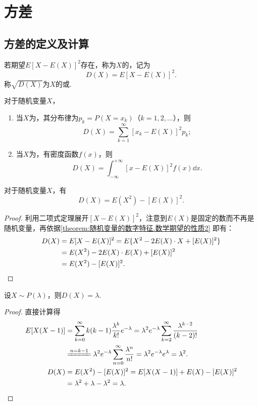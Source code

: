 \section{方差}
\subsection{方差的定义及计算}
\begin{definition}
若期望\(E[X-E(X)]^2\)存在，称为\(X\)的，记为\[
D(X) = E[X-E(X)]^2.
\]称\(\sqrt{D(X)}\)为\(X\)的或.
\end{definition}

\begin{theorem}
对于随机变量\(X\)，%
\begin{enumerate}
\item 当\(X\)为，其分布律为\(p_k = P(X=x_k)\)（\(k=1,2,\dotsc\)），则\[
D(X) = \sum\limits_{k=1}^\infty [x_k - E(X)]^2 p_k;
\]
\item 当\(X\)为，有密度函数\(f(x)\)，则\[
D(X) = \int_{-\infty}^{+\infty} [x - E(X)]^2 f(x) \dd{x}.
\]
\end{enumerate}
\end{theorem}

\begin{corollary}\label{theorem:随机变量的数字特征.常用的方差的计算式}
对于随机变量\(X\)，有\begin{equation}
D(X) = E(X^2) - [E(X)]^2.
\end{equation}
\begin{proof}
利用二项式定理展开\([X-E(X)]^2\)，注意到\(E(X)\)是固定的数而不再是随机变量，再依据\cref{theorem:随机变量的数字特征.数学期望的性质2} 即有：
\begin{align*}
D(X) &= E[X-E(X)]^2
= E\{X^2 - 2E(X) \cdot X + [E(X)]^2\} \\
&= E(X^2) - 2E(X) \cdot E(X) + [E(X)]^2 \\
&= E(X^2) - [E(X)]^2.
\qedhere
\end{align*}
\end{proof}
\end{corollary}

\begin{theorem}
设\(X \sim P(\lambda)\)，则\(D(X) = \lambda\).
\begin{proof}
直接计算得
\begin{align*}
E[X(X-1)]
&= \sum\limits_{k=0}^\infty {k(k-1) \frac{\lambda^k}{k!} e^{-\lambda}}
= \lambda^2 e^{-\lambda} \sum\limits_{k=2}^\infty {\frac{\lambda^{k-2}}{(k-2)!}} \\
&\xlongequal{n=k-1} \lambda^2 e^{-\lambda} \sum\limits_{n=0}^\infty {\frac{\lambda^n}{n!}}
= \lambda^2 e^{-\lambda} e^{\lambda} = \lambda^2. \\
D(X)
&= E(X^2) - [E(X)]^2
= E[X(X-1)] + E(X) - [E(X)]^2 \\
&= \lambda^2 + \lambda - \lambda^2 = \lambda.
\qedhere
\end{align*}
\end{proof}
\end{theorem}


